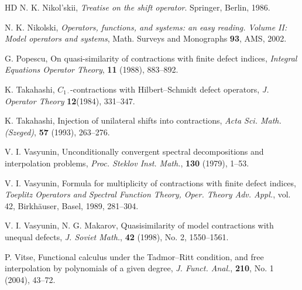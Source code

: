 \documentclass[a4paper,oneside,11pt]{amsart}
\numberwithin{equation}{section}
\theoremstyle{plain}
\theoremstyle{definition}
\begin{document}
\begin{thebibliography}{HD}
  N. K. Nikol'skii, {\it Treatise on the shift operator}. Springer, Berlin, 1986.  

  N. K. Nikolski, {\it  Operators, functions, and systems: an easy reading.
 Volume II: Model operators and systems}, Math. Surveys and Monographs 
{\bf 93}, AMS, 2002.  

 G. Popescu, On quasi-similarity of contractions with finite defect indices,  \emph{Integral Equations Operator Theory}, {\bf 11} (1988), 883--892. 

 K. Takahashi,  $C_{1\cdot }$-contractions with Hilbert--Schmidt defect operators, 
\emph{J. Operator Theory} {\bf 12}(1984),  331--347.
 

 K. Takahashi, Injection of unilateral shifts into contractions, \emph {Acta Sci. Math. (Szeged)},
 {\bf 57} (1993), 263--276.

 V. I. Vasyunin,  Unconditionally convergent spectral decompositions and interpolation problems, 
\emph{Proc. Steklov Inst. Math.}, {\bf 130} (1979), 1--53.


 V. I. Vasyunin, Formula for multiplicity of contractions with finite defect indices, 
\emph{Toeplitz Operators and Spectral Function Theory, Oper. Theory Adv. Appl.}, vol. 42, Birkh\"auser, Basel, 1989,  281--304.

 V. I. Vasyunin, N. G.  Makarov, 
Quasisimilarity of model contractions with unequal defects, \emph{J. Soviet Math.}, {\bf 42} (1998),  No. 2, 1550--1561.

  P. Vitse,  Functional calculus under the Tadmor--Ritt condition, and free interpolation by polynomials of a given degree, \emph{J. Funct. Anal.},  {\bf 210}, No. 1 (2004), 43--72.


\end{thebibliography}
\end{document}
